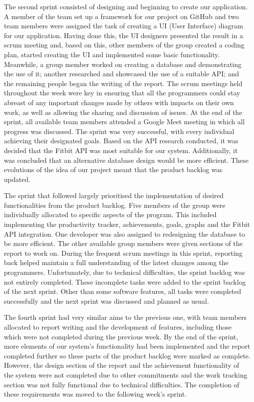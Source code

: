 \documentclass[11pt]{article}
\begin{document}
The second sprint consisted of designing and beginning to create our
application. A member of the team set up a framework for our project on GitHub
and two team members were assigned the task of creating a UI (User Interface)
diagram for our application. Having done this, the UI designers presented the
result in a scrum meeting and, based on this, other members of the group
created a coding plan, started creating the UI and implemented some basic
functionality. Meanwhile, a group member worked on creating a database and
demonstrating the use of it; another researched and showcased the use of a
suitable API; and the remaining people began the writing of the report. The
scrum meetings held throughout the week were key in ensuring that all the
programmers could stay abreast of any important changes made by others with
impacts on their own work, as well as allowing the sharing and discussion of
issues. At the end of the sprint, all available team members attended a Google
Meet meeting in which all progress was discussed. The sprint was very
successful, with every individual achieving their designated goals. Based on
the API research conducted, it was decided that the Fitbit API was most
suitable for our system. Additionally, it was concluded that an alternative
database design would be more efficient. These evolutions of the idea of our
project meant that the product backlog was updated.\par

The sprint that followed largely prioritised the implementation of desired
functionalities from the product backlog. Five members of the group were
individually allocated to specific aspects of the program. This included
implementing the productivity tracker, achievements, goals, graphs and the
Fitbit API integration. One developer was also assigned to redesigning the
database to be more efficient. The other available group members were given
sections of the report to work on. During the frequent scrum meetings in this
sprint, reporting back helped maintain a full understanding of the latest
changes among the programmers. Unfortunately, due to technical difficulties,
the sprint backlog was not entirely completed. These incomplete tasks were
added to the sprint backlog of the next sprint. Other than some software
features, all tasks were completed successfully and the next sprint was
discussed and planned as usual.\par

The fourth sprint had very similar aims to the previous one, with team members
allocated to report writing and the development of features, including those
which were not completed during the previous week. By the end of the sprint,
more elements of our system's functionality had been implemented and the report
completed further so these parts of the product backlog were marked as
complete. However, the design section of the report and the achievement
functionality of the system were not completed due to other commitments and the
work tracking section was not fully functional due to technical difficulties.
The completion of these requirements was moved to the following week's
sprint.\par
\end{document}
